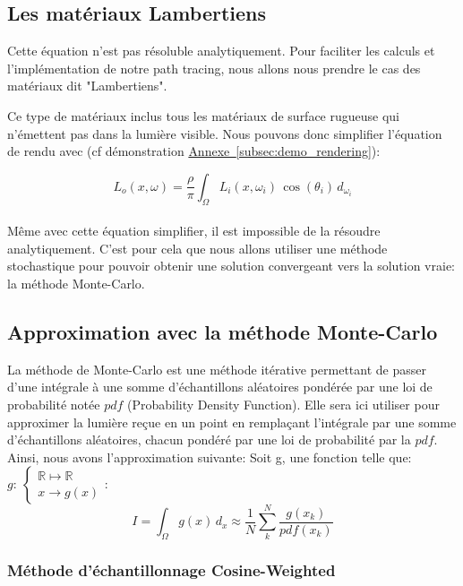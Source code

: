 \subsection{Les matériaux Lambertiens}

Cette équation n'est pas résoluble analytiquement. Pour faciliter les calculs et l'implémentation de notre path tracing, nous allons nous prendre le cas des matériaux dit "Lambertiens".

Ce type de matériaux inclus tous les matériaux de surface rugueuse qui n'émettent pas dans la lumière visible. Nous pouvons donc simplifier l'équation de rendu avec (cf démonstration \hyperref[subsec:demo_rendering]{Annexe~\ref*{subsec:demo_rendering}}):


$$ 
\boxed{L_o(x, \omega) = \frac\rho\pi \int_\Omega L_i(x, \omega_i) \, \cos\left(\theta_i\right) \, d_{\omega_i}}
$$\\

Même avec cette équation simplifier, il est impossible de la résoudre analytiquement. C'est pour cela que nous allons utiliser une méthode stochastique pour pouvoir obtenir une solution convergeant vers la solution vraie: la méthode Monte-Carlo.\\

\subsection{Approximation avec la méthode Monte-Carlo}

La méthode de Monte-Carlo est une méthode itérative permettant de passer d'une intégrale à une somme d'échantillons aléatoires pondérée par une loi de probabilité notée $pdf$ (Probability Density Function). Elle sera ici utiliser pour approximer la lumière reçue en un point en remplaçant l’intégrale par une somme d’échantillons aléatoires, chacun pondéré par une loi de probabilité par la $pdf$.\\

Ainsi, nous avons l'approximation suivante:
Soit g, une fonction telle que: $g:\ \left\{
\begin{array}{l}
\mathbb{R} \longmapsto \mathbb{R}\\
x\longrightarrow g(x)
\end{array}
\right.$:
$$
I = \int_\Omega g(x) \, d_x \approx \frac{1}{N} \sum_k^N \frac{g(x_k)}{pdf(x_k)}
$$
\subsubsection{Méthode d'échantillonnage Cosine-Weighted} 

